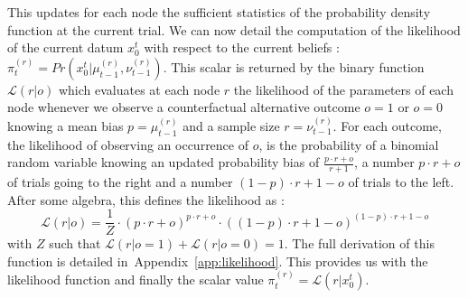 \documentclass[12pt,english]{article}%
\newcommand{\eq}[1]{\begin{equation*}#1\end{equation*}}
\newcommand{\eql}[1]{\begin{equation}#1\end{equation}}
\newcommand{\Ll}{\mathcal{L}}
\newcommand{\seeApp}[1]{Appendix~\ref{app:#1}}
\begin{document}
This updates for each node the sufficient statistics of the probability density function at the current trial.
We can now detail the computation of the likelihood of the current datum $x_0^{t}$ with respect to
the current beliefs : $\pi^{(r)}_t = Pr( x_0^{t} |  \mu^{(r)}_{t-1}, \nu^{(r)}_{t-1})$. %
This scalar is returned by the binary function 
$\Ll(r | o)$ which evaluates at each node $r$ the likelihood of the parameters of each node
whenever we observe a counterfactual alternative outcome $o=1$ or $o=0$
knowing a mean bias $p=\mu^{(r)}_{t-1}$
and a sample size $r=\nu^{(r)}_{t-1}$.
For each outcome, the likelihood of observing an occurrence of $o$,
is the probability of a binomial random variable knowing
an updated probability bias of $\frac{p \cdot r + o}{r+1}$,
a number $p \cdot r + o$ of trials going to the right and
a number $(1-p) \cdot r + 1 - o$ of trials to the left.
After some algebra, this defines the likelihood as :
\eql{
\Ll(r | o) = \frac{1}{Z} \cdot {(p \cdot r + o)}^{p \cdot r + o} \cdot {((1- p)\cdot r + 1- o)}^{(1- p)\cdot r + 1- o}
\label{eq:likelihood}
}
with $Z$ such that $\Ll(r | o=1) + \Ll(r | o=0)=1$. %
The full derivation of this function is detailed in~\seeApp{likelihood}.
This provides us with the likelihood function
and finally the scalar value $\pi^{(r)}_t = \Ll(r | x_0^{t})$.
\end{document}
